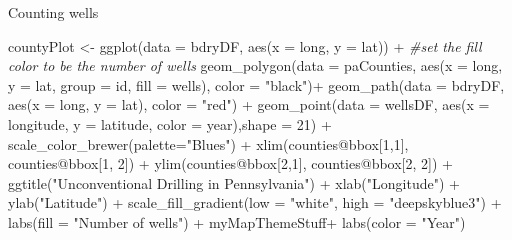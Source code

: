 \documentclass[
  ignorenonframetext,
]{beamer}
\newenvironment{Shaded}{\begin{snugshade}}{\end{snugshade}}
\newcommand{\AttributeTok}[1]{\textcolor[rgb]{0.77,0.63,0.00}{#1}}
\newcommand{\CommentTok}[1]{\textcolor[rgb]{0.56,0.35,0.01}{\textit{#1}}}
\newcommand{\DecValTok}[1]{\textcolor[rgb]{0.00,0.00,0.81}{#1}}
\newcommand{\FunctionTok}[1]{\textcolor[rgb]{0.00,0.00,0.00}{#1}}
\newcommand{\NormalTok}[1]{#1}
\newcommand{\OtherTok}[1]{\textcolor[rgb]{0.56,0.35,0.01}{#1}}
\newcommand{\SpecialCharTok}[1]{\textcolor[rgb]{0.00,0.00,0.00}{#1}}
\newcommand{\StringTok}[1]{\textcolor[rgb]{0.31,0.60,0.02}{#1}}
\begin{document}
\begin{frame}[fragile]{Counting wells}
\begin{Shaded}
\begin{Highlighting}[]
\NormalTok{countyPlot }\OtherTok{\textless{}{-}} \FunctionTok{ggplot}\NormalTok{(}\AttributeTok{data =}\NormalTok{ bdryDF, }\FunctionTok{aes}\NormalTok{(}\AttributeTok{x =}\NormalTok{ long, }\AttributeTok{y =}\NormalTok{ lat)) }\SpecialCharTok{+}
    \CommentTok{\#set the fill color to be the number of wells}
      \FunctionTok{geom\_polygon}\NormalTok{(}\AttributeTok{data =}\NormalTok{ paCounties, }\FunctionTok{aes}\NormalTok{(}\AttributeTok{x =}\NormalTok{ long, }\AttributeTok{y =}\NormalTok{ lat, }\AttributeTok{group =}\NormalTok{ id, }\AttributeTok{fill =}\NormalTok{ wells), }\AttributeTok{color =} \StringTok{"black"}\NormalTok{)}\SpecialCharTok{+} 
      \FunctionTok{geom\_path}\NormalTok{(}\AttributeTok{data =}\NormalTok{ bdryDF, }\FunctionTok{aes}\NormalTok{(}\AttributeTok{x =}\NormalTok{ long, }\AttributeTok{y =}\NormalTok{ lat), }\AttributeTok{color =} \StringTok{"red"}\NormalTok{) }\SpecialCharTok{+}
      \FunctionTok{geom\_point}\NormalTok{(}\AttributeTok{data =}\NormalTok{ wellsDF, }\FunctionTok{aes}\NormalTok{(}\AttributeTok{x =}\NormalTok{ longitude, }\AttributeTok{y =}\NormalTok{ latitude, }\AttributeTok{color =}\NormalTok{ year),}\AttributeTok{shape =} \DecValTok{21}\NormalTok{) }\SpecialCharTok{+}
      \FunctionTok{scale\_color\_brewer}\NormalTok{(}\AttributeTok{palette=}\StringTok{"Blues"}\NormalTok{) }\SpecialCharTok{+}
      \FunctionTok{xlim}\NormalTok{(counties}\SpecialCharTok{@}\NormalTok{bbox[}\DecValTok{1}\NormalTok{,}\DecValTok{1}\NormalTok{], counties}\SpecialCharTok{@}\NormalTok{bbox[}\DecValTok{1}\NormalTok{, }\DecValTok{2}\NormalTok{]) }\SpecialCharTok{+}
      \FunctionTok{ylim}\NormalTok{(counties}\SpecialCharTok{@}\NormalTok{bbox[}\DecValTok{2}\NormalTok{,}\DecValTok{1}\NormalTok{], counties}\SpecialCharTok{@}\NormalTok{bbox[}\DecValTok{2}\NormalTok{, }\DecValTok{2}\NormalTok{]) }\SpecialCharTok{+}
      \FunctionTok{ggtitle}\NormalTok{(}\StringTok{"Unconventional Drilling in Pennsylvania"}\NormalTok{) }\SpecialCharTok{+}
      \FunctionTok{xlab}\NormalTok{(}\StringTok{"Longitude"}\NormalTok{) }\SpecialCharTok{+} 
      \FunctionTok{ylab}\NormalTok{(}\StringTok{"Latitude"}\NormalTok{) }\SpecialCharTok{+}
      \FunctionTok{scale\_fill\_gradient}\NormalTok{(}\AttributeTok{low =} \StringTok{"white"}\NormalTok{, }\AttributeTok{high =} \StringTok{"deepskyblue3"}\NormalTok{) }\SpecialCharTok{+}
      \FunctionTok{labs}\NormalTok{(}\AttributeTok{fill =} \StringTok{"Number of wells"}\NormalTok{) }\SpecialCharTok{+}
\NormalTok{      myMapThemeStuff}\SpecialCharTok{+}
      \FunctionTok{labs}\NormalTok{(}\AttributeTok{color =} \StringTok{"Year"}\NormalTok{)}
\end{Highlighting}
\end{Shaded}
\end{frame}
\end{document}
